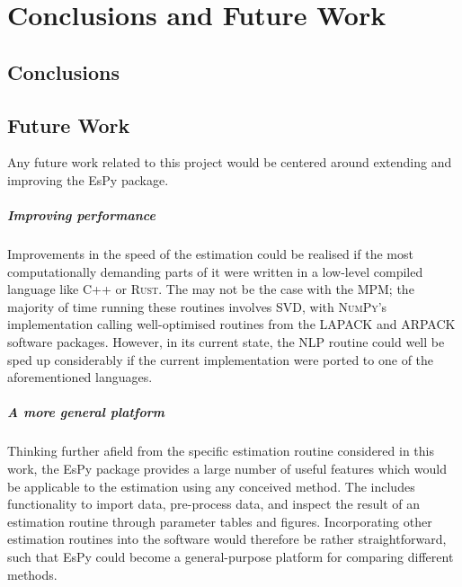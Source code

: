 \chapter{Conclusions and Future Work}
\label{chap:conclusions}

\section{Conclusions}

\section{Future Work}
\label{sec:future-work}
Any future work related to this project would be centered around extending and
improving the \ac{EsPy} package.

\paragraph{Improving performance}
Improvements in the speed of the estimation
could be realised if the most computationally demanding parts of it were
written in a low-level compiled language like C++ or \textsc{Rust}. The may not
be the case with the \ac{MPM}; the majority of time running these routines
involves \ac{SVD}, with \textsc{NumPy}'s implementation calling well-optimised
routines from the \textsc{LAPACK} and \textsc{ARPACK} software packages.
However, in its current state, the \ac{NLP} routine could well be sped up
considerably if the current \Python implementation were ported to one of the
aforementioned languages.

\paragraph{A more general platform}
Thinking further afield from the specific estimation routine considered in this
work, the \ac{EsPy} package provides a large number of useful features which
would be applicable to the estimation using any conceived method. The includes
functionality to import data, pre-process data, and inspect the result of an
estimation routine through parameter tables and figures.
Incorporating other estimation routines into the software would therefore be
rather straightforward, such that \ac{EsPy} could become a general-purpose
platform for comparing different methods.

